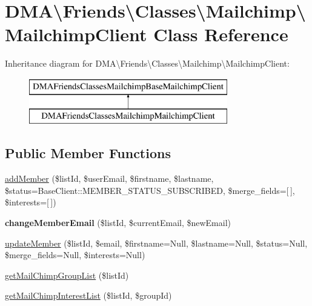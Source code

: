 \hypertarget{classDMA_1_1Friends_1_1Classes_1_1Mailchimp_1_1MailchimpClient}{}\section{D\+M\+A\textbackslash{}Friends\textbackslash{}Classes\textbackslash{}Mailchimp\textbackslash{}Mailchimp\+Client Class Reference}
\label{classDMA_1_1Friends_1_1Classes_1_1Mailchimp_1_1MailchimpClient}
Inheritance diagram for D\+M\+A\textbackslash{}Friends\textbackslash{}Classes\textbackslash{}Mailchimp\textbackslash{}Mailchimp\+Client\+:\begin{figure}[H]
\begin{center}
\leavevmode
\includegraphics[height=2.000000cm]{dd/d57/classDMA_1_1Friends_1_1Classes_1_1Mailchimp_1_1MailchimpClient}
\end{center}
\end{figure}
\subsection*{Public Member Functions}
\begin{DoxyCompactItemize}
\item 
\hyperlink{classDMA_1_1Friends_1_1Classes_1_1Mailchimp_1_1MailchimpClient_a35c83f2795213a432c56477e417db249}{add\+Member} (\$list\+Id, \$user\+Email, \$firstname, \$lastname, \$status=Base\+Client\+::\+M\+E\+M\+B\+E\+R\+\_\+\+S\+T\+A\+T\+U\+S\+\_\+\+S\+U\+B\+S\+C\+R\+I\+B\+E\+D, \$merge\+\_\+fields=\mbox{[}$\,$\mbox{]}, \$interests=\mbox{[}$\,$\mbox{]})
\item 
\hypertarget{classDMA_1_1Friends_1_1Classes_1_1Mailchimp_1_1MailchimpClient_a41a2ca3b8a4bb416abe957ea7192506b}{}{\bfseries change\+Member\+Email} (\$list\+Id, \$current\+Email, \$new\+Email)\label{classDMA_1_1Friends_1_1Classes_1_1Mailchimp_1_1MailchimpClient_a41a2ca3b8a4bb416abe957ea7192506b}

\item 
\hyperlink{classDMA_1_1Friends_1_1Classes_1_1Mailchimp_1_1MailchimpClient_a0a24afcd805c9ce1ebe35ac1700d5703}{update\+Member} (\$list\+Id, \$email, \$firstname=Null, \$lastname=Null, \$status=Null, \$merge\+\_\+fields=Null, \$interests=Null)
\item 
\hyperlink{classDMA_1_1Friends_1_1Classes_1_1Mailchimp_1_1MailchimpClient_a746d820706553de9e10f8206f88a5192}{get\+Mail\+Chimp\+Group\+List} (\$list\+Id)
\item 
\hyperlink{classDMA_1_1Friends_1_1Classes_1_1Mailchimp_1_1MailchimpClient_a3ba438601e1007893b4ef5ba34de82b6}{get\+Mail\+Chimp\+Interest\+List} (\$list\+Id, \$group\+Id)
\end{DoxyCompactItemize}
